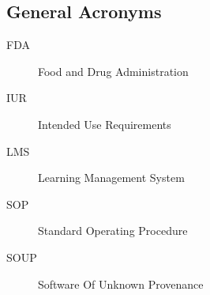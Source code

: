 \subsection{General Acronyms}
\begin{description}
\item[FDA]  Food and Drug Administration
\item[IUR]  Intended Use Requirements
\item[LMS]  Learning Management System
\item[SOP]  Standard Operating Procedure
\item[SOUP] Software Of Unknown Provenance
\end{description}
